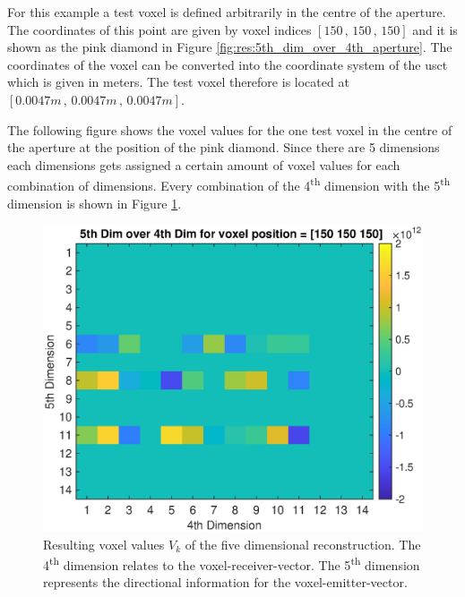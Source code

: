  For this example a test voxel is defined arbitrarily in the centre of the aperture. The coordinates of this point are given by voxel indices $[150\, , \, 150\, , \, 150]$ and it is shown as the pink diamond in Figure \ref{fig:res:5th_dim_over_4th_aperture}. The coordinates of the voxel can be converted into the coordinate system of the \ac{usct} which is given in meters. The test voxel therefore is located at $[0.0047m\, , \, 0.0047m\, , \, 0.0047m]$.

The following figure shows the voxel values for the one test voxel in the centre of the aperture at the position of the pink diamond. Since there are 5 dimensions each dimensions gets assigned a certain amount of voxel values for each combination of dimensions. Every combination of the 4\textsuperscript{th} dimension with the 5\textsuperscript{th} dimension is shown in Figure \ref{fig:res:5th_dim_over_4th_result}.
 
 
\begin{figure}[H]
    \centering
    \includegraphics[width=0.89\linewidth]{Graphics/Results/4d_5d/5thDim_over_4thDim_150_150_150.eps}
    \caption{Resulting voxel values $V_k$ of the five dimensional reconstruction. The 4\textsuperscript{th} dimension relates to the voxel-receiver-vector. The 5\textsuperscript{th} dimension represents the directional information for the voxel-emitter-vector.}
    \label{fig:res:5th_dim_over_4th_result}
\end{figure}

